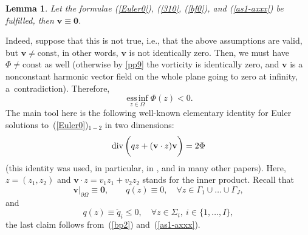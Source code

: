\documentclass[11pt]{article}
\newtheorem{lemma}[theorem]{Lemma}
\numberwithin{equation}{section}
\numberwithin{figure}{section}
\newcommand{\essinf}{\mathop{\mathrm{ess\,inf}}}
\def\const{{\mathrm{const}}}
\def\div{\hbox{\rm div}\,}
\def\ve{{\mathbf v}}
\def\0{{\mathbf 0}}
\begin{document}
\begin{lemma}
\label{lemma-E-0} {\sl Let the formulae {\rm(\ref{Euler0})}, {\rm(\ref{310}}, {\rm(\ref{bf0})}, and {\rm(\ref{as1-axxx})} be fulfilled, then 
$\ve\equiv\0$.
}
\end{lemma}
\medskip
Indeed, suppose that this is not true, i.e., that the above assumptions are valid, but
$ \ve\ne\const$,
in other words, $\ve$ is not identically zero. Then, we must have $\Phi\ne\const$ as well (otherwise by \eqref{pp9} the vorticity  is identically zero, and $\ve$ is a nonconstant harmonic vector field on the whole plane going to zero at infinity, a~contradiction). Therefore,
 \begin{equation}\label{i-as1} \essinf\limits_{z\in\Omega}\Phi(z)<0.
\end{equation}
The main tool here is the following well-known elementary identity for Euler solutions to~(\ref{Euler0})$_{1-2}$ in two dimensions:
 \begin{equation}\label{i-as2} \div\biggl(q z+(\ve\cdot z)\ve\biggr)=2\Phi
\end{equation}
(this identity was used, in particular, in \cite{kpr,korobkov2015solution}, and in many other papers).
Here, $z = (z_1, z_2)$ and $\ve\cdot z=v_1z_1+v_2z_2$ stands for the inner product. Recall that
 \begin{equation}\label{i-as3} \ve|_{\partial\Omega}\equiv\0,
\qquad q(z)\equiv 0,\quad\forall z\in\Gamma_1\cup\dots\cup\Gamma_J,
\end{equation}
and
\begin{equation}\label{i-as5} q(z)\equiv \check q_i\le0,\quad\forall
z\in\Sigma_i, \ i\in\{1,\dots,I\},\end{equation}
the last claim follows from~(\ref{bp2}) and~(\ref{as1-axxx}).
\end{document}
